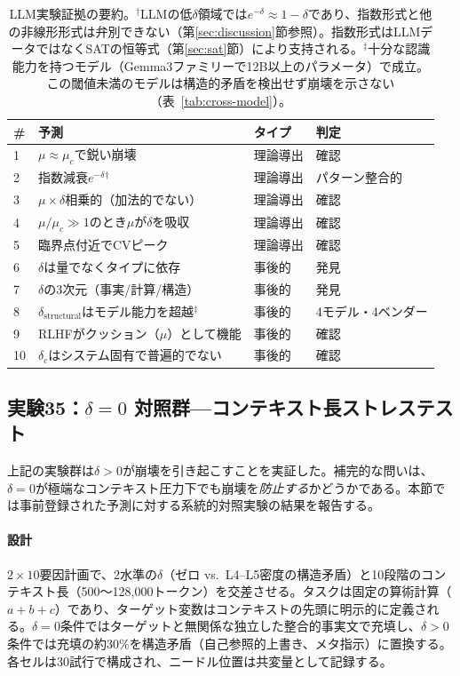\documentclass[11pt,a4paper]{article}
\begin{document}
\begin{table}[htbp]
\centering
\small
\begin{tabular}{llll}
\toprule
\textbf{\#} & \textbf{予測} & \textbf{タイプ} & \textbf{判定} \\
\midrule
1 & $\mu \approx \mu_c$で鋭い崩壊 & 理論導出 & 確認 \\
2 & 指数減衰$e^{-\delta}$$^\dagger$ & 理論導出 & パターン整合的 \\
3 & $\mu \times \delta$相乗的（加法的でない） & 理論導出 & 確認 \\
4 & $\mu/\mu_c \gg 1$のとき$\mu$が$\delta$を吸収 & 理論導出 & 確認 \\
5 & 臨界点付近でCVピーク & 理論導出 & 確認 \\
\midrule
6 & $\delta$は量でなくタイプに依存 & 事後的 & 発見 \\
7 & $\delta$の3次元（事実/計算/構造） & 事後的 & 発見 \\
8 & $\delta_{\text{structural}}$はモデル能力を超越$^\ddagger$ & 事後的 & 4モデル・4ベンダー \\
9 & RLHFがクッション（$\mu$）として機能 & 事後的 & 確認 \\
10 & $\delta_c$はシステム固有で普遍的でない & 事後的 & 確認 \\
\bottomrule
\end{tabular}
\caption{LLM実験証拠の要約。$^\dagger$LLMの低$\delta$領域では$e^{-\delta} \approx 1 - \delta$であり、指数形式と他の非線形形式は弁別できない（第\ref{sec:discussion}節参照）。指数形式はLLMデータではなくSATの恒等式（第\ref{sec:sat}節）により支持される。$^\ddagger$十分な認識能力を持つモデル（Gemma3ファミリーで12B以上のパラメータ）で成立。この閾値未満のモデルは構造的矛盾を検出せず崩壊を示さない（表~\ref{tab:cross-model}）。}
\label{tab:llm-summary}
\end{table}

\subsection{実験35：$\delta = 0$ 対照群---コンテキスト長ストレステスト}
\label{sec:exp35}

上記の実験群は$\delta > 0$が崩壊を引き起こすことを実証した。補完的な問いは、$\delta = 0$が極端なコンテキスト圧力下でも崩壊を\emph{防止する}かどうかである。本節では事前登録された予測に対する系統的対照実験の結果を報告する。

\paragraph{設計}
$2 \times 10$要因計画で、2水準の$\delta$（ゼロ vs.\ L4--L5密度の構造矛盾）と10段階のコンテキスト長（500〜128{,}000トークン）を交差させる。タスクは固定の算術計算（$a + b + c$）であり、ターゲット変数はコンテキストの先頭に明示的に定義される。$\delta = 0$条件ではターゲットと無関係な独立した整合的事実文で充填し、$\delta > 0$条件では充填の約30\%を構造矛盾（自己参照的上書き、メタ指示）に置換する。各セルは30試行で構成され、ニードル位置は共変量として記録する。
\end{document}
